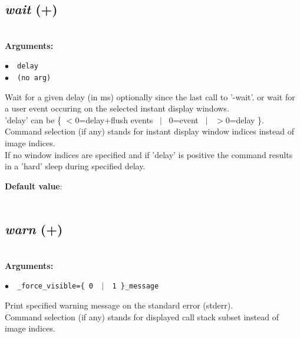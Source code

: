\documentclass[a4paper,10.5pt,twoside]{book}
\def\comma{\discretionary{,}{}{,}}
\newcommand{\Cb}[1]{\textcolor{cb}{#1}}
\newcommand{\Cc}[1]{\textcolor{cc}{#1}}
\begin{document}
\subsection{\emph{wait} (+)}\vspace*{-0.7em}
~\\\textbf{\Cb{Arguments: }}\begin{flushleft}
{\small \Cb{\hspace*{0.5cm}$\bullet$~~\texttt{delay}}}~~~\\
{\small \Cb{\hspace*{0.5cm}$\bullet$~~\texttt{(no arg)}}}\end{flushleft}
Wait for a given delay (in ms){\comma} optionally since the last call to '-wait'.
or wait for a user event occuring on the selected instant display windows.
~\\'delay' can be \{ $<$0=delay+flush events ~$|$~ 0=event ~$|$~ $>$0=delay \}.
~\\Command selection (if any) stands for instant display window indices instead of image indices.
~\\If no window indices are specified and if 'delay' is positive{\comma} the command results
in a 'hard' sleep during specified delay.
\begin{flushleft}\Cc{\textbf{Default value}:\\~\\\hspace*{0.5cm}{\small $\bullet$~~\texttt{'delay=0'.}}}\end{flushleft}


\subsection{\emph{warn} (+)}\vspace*{-0.7em}
~\\\textbf{\Cb{Arguments: }}\begin{flushleft}
{\small \Cb{\hspace*{0.5cm}$\bullet$~~\texttt{\_force\_visible=\{ 0 ~$|$~ 1 \}{\comma}\_message}}}\end{flushleft}
Print specified warning message{\comma} on the standard error (stderr).
~\\Command selection (if any) stands for displayed call stack subset instead of image indices.
\end{document}
